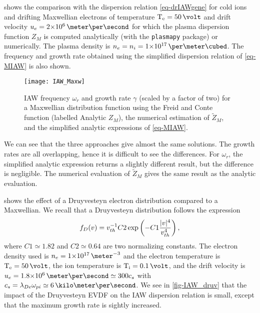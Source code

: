    shows the comparison with the dispersion relation \cref{eq-drIAWgene} for cold ions and drifting Maxwellian electrons of temperature $\Te=50\,\volt$ and drift velocity $u_e = \sn{2}{6} \,\meter\per\second$ for which the plasma dispersion function $Z_M$ is computed analytically (with the \texttt{plasmapy} package) or numerically.
  The plasma density is $n_e = n_i = \sn{1}{17} \,\per\meter\cubed$.
  The frequency and growth rate obtained using the simplified dispersion relation of \cref{eq-MIAW} is also shown. 
  
  \begin{figure}[hbt]
    \centering
    \texttt{[image: IAW\_Maxw]}
    \caption{IAW frequency $\omega_r$ and growth rate $\gamma$ (scaled by a factor of two) for a Maxwellian distribution function using the Freid and Conte function (labelled Analytic $Z_M$), the numerical estimation of $\tilde{Z}_M$, and the simplified analytic expressions of \cref{eq-MIAW}. }
    \label{fig-IAW_Maxw}
  \end{figure}
  
  We can see that the three approaches give almost the same solutions.
  The growth rates are all overlapping, hence it is difficult to see the differences.
  For $\omega_r$, the simplified analytic expression returns a slightly different result, but the difference is negligible.
  The numerical evaluation of $\tilde{Z}_M$ gives the same result as the analytic evaluation.
  
   shows the effect of a Druyvesteyn electron distribution compared to a Maxwellian.
  We recall that a Druyvesteyn distribution follows the expression
  \begin{equation} \label{eq-druyv}
    f_{D}(v) = v_{th}^{-1} C2 \exp \left( -C1 \frac{\lvert v\rvert^4}{v_{th}^4}  \right) ,
  \end{equation}
  where $C1 \simeq 1.82$ and $C2 \simeq 0.64$ are two normalizing constants.
  The electron density used is $n_e=\sn{1}{17}\,\meter^{-3}$ and the electron temperature is $\Te=50\,\volt$, the ion temperature is $\Ti=0.1\,\volt$, and the drift velocity is $u_e=\sn{1.8}{6}\,\meter\per\second \simeq 300 c_s$ with $c_s=\lde \opi\simeq 6\,\kilo\meter\per\second$.
  We see in \cref{fig-IAW_druv} that the impact of the Druyvesteyn \ac{EVDF} on the \ac{IAW} dispersion relation is small, except that the maximum growth rate is sightly increased.
  
